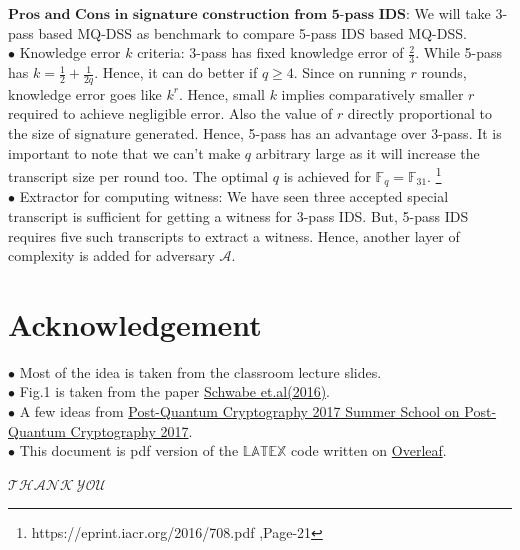 \documentclass{article}
\begin{document}
$\textbf{Pros and Cons in signature construction from 5-pass IDS:}$ We will take 3-pass based MQ-DSS as benchmark to compare 5-pass IDS based MQ-DSS.\\
$\bullet$ Knowledge error $k$ criteria: 3-pass has fixed knowledge error of $\frac{2}{3}$. While 5-pass has $k = \frac{1}{2} + \frac{1}{2q}$. Hence, it can do better if $q\geq4$. Since on running $r$ rounds, knowledge error goes like $k^r$. Hence, small $k$ implies comparatively smaller $r$ required to achieve negligible error. Also the value of $r$ directly proportional to the size of signature generated. Hence, 5-pass has an advantage over 3-pass. It is important to note that we can't make $q$ arbitrary large as it will increase the transcript size per round too. The optimal $q$ is achieved for $\mathbb{F}_q = \mathbb{F}_{31}$. \footnote{https://eprint.iacr.org/2016/708.pdf ,Page-21} \\
$\bullet$ Extractor for computing witness: We have seen three accepted special transcript is sufficient for getting a witness for 3-pass IDS. But, 5-pass IDS requires five such transcripts to extract a witness. Hence, another layer of complexity is added for adversary $\mathcal{A}.$ 


\section*{Acknowledgement}
$\bullet$ Most of the idea is taken from the classroom lecture slides.\\
$\bullet$ Fig.1 is taken from the paper \hyperlink{https://eprint.iacr.org/2016/708.pdf}{Schwabe et.al(2016)}.\\
$\bullet$ A few ideas from \hyperlink{https://2017.pqcrypto.org/school/schedule.html}{Post-Quantum Cryptography 2017 Summer School on Post-Quantum Cryptography 2017}.
\\
$\bullet$ This document is pdf version of the $\mathbb{LATEX}$ code written on \hyperlink{https://www.overleaf.com/read/tmqfgrkddzkj}{Overleaf}.\\
\begin{center}
   $\mathcal{THANK\ YOU}$
\end{center} 
                                       
\end{document}
